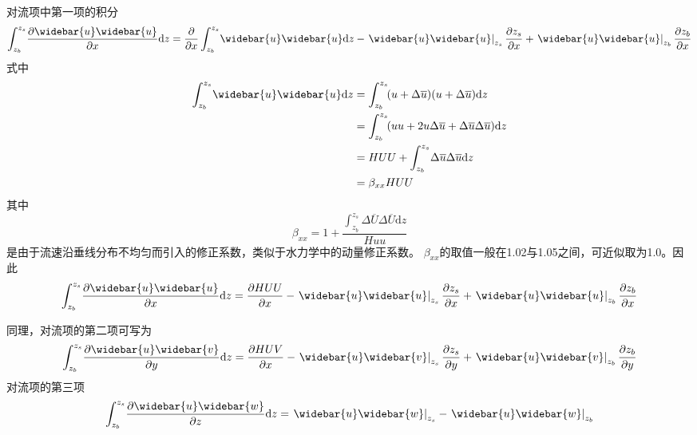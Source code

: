 对流项中第一项的积分
\begin{equation}
  \int_{z_{b}}^{ z_{s}}\!
  \frac{\partial \widebar{u}\widebar{u}}{\partial x}
  \mathrm{d}z
  =
  \frac{\partial}{\partial x}
  \int_{z_{b}}^{ z_{s}}\!
  \widebar{u}\widebar{u}
  \mathrm{d}z
  -
  \left.\widebar{u}\widebar{u}\right|_{z_{s}}\frac{\partial  z_{s}}{\partial x}
  +
  \left.\widebar{u}\widebar{u}\right|_{z_{b}}\frac{\partial z_{b}}{\partial x}
  \label{EqCGe_CT_1st}
\end{equation}
式中
\begin{equation*}
  \begin{aligned}
    \int_{z_{b}}^{ z_{s}}\!
    \widebar{u}\widebar{u}
    \mathrm{d}z
    &=
    \int_{z_{b}}^{ z_{s}}\!
    (u+\Delta\overline{u})(u+\Delta\overline{u})
    \mathrm{d}z
    \\
    &=
    \int_{z_{b}}^{ z_{s}}\!
    (uu+2u\Delta\overline{u}+\Delta\overline{u}\Delta\overline{u})
    \mathrm{d}z
    \\
    &=
    HUU
    +
    \int_{z_{b}}^{ z_{s}}\!
    \Delta\overline{u}\Delta\overline{u}
    \mathrm{d}z
    \\
    &=
    \beta_{xx}HUU
  \end{aligned}
\end{equation*}
其中
\begin{equation}
  \beta_{xx}
  =
  1 +
  \frac
  {
    \int_{z_{b}}^{ z_{s}}\!
    \Delta\overline{U}\Delta\overline{U}
    \mathrm{d}z
  }
  {Huu}
\end{equation}
是由于流速沿垂线分布不均匀而引入的修正系数，类似于水力学中的动量修正系数。
$\beta_{xx}$的取值一般在1.02与1.05之间，可近似取为1.0。因此
\begin{equation}
  \int_{z_{b}}^{ z_{s}}\!
  \frac{\partial \widebar{u}\widebar{u}}{\partial x}
  \mathrm{d}z
  =
  \frac{\partial HUU}{\partial x}
  -
  \left.\widebar{u}\widebar{u}\right|_{z_{s}}\frac{\partial  z_{s}}{\partial x}
  +
  \left.\widebar{u}\widebar{u}\right|_{z_{b}}\frac{\partial z_{b}}{\partial x}
\end{equation}

同理，对流项的第二项可写为
\begin{equation}
  \int_{z_{b}}^{ z_{s}}\!
  \frac{\partial \widebar{u}\widebar{v}}{\partial y}
  \mathrm{d}z
  =
  \frac{\partial HUV}{\partial x}
  -
  \left.\widebar{u}\widebar{v}\right|_{z_{s}}\frac{\partial  z_{s}}{\partial y}
  +
  \left.\widebar{u}\widebar{v}\right|_{z_{b}}\frac{\partial z_{b}}{\partial y}
\end{equation}
对流项的第三项
\begin{equation}
  \int_{z_{b}}^{ z_{s}}\!
  \frac{\partial \widebar{u}\widebar{w}}{\partial z}
  \mathrm{d}z
  =
  \left.\widebar{u}\widebar{w}\right|_{z_{s}}
  -
  \left.\widebar{u}\widebar{w}\right|_{z_{b}}
\end{equation}

